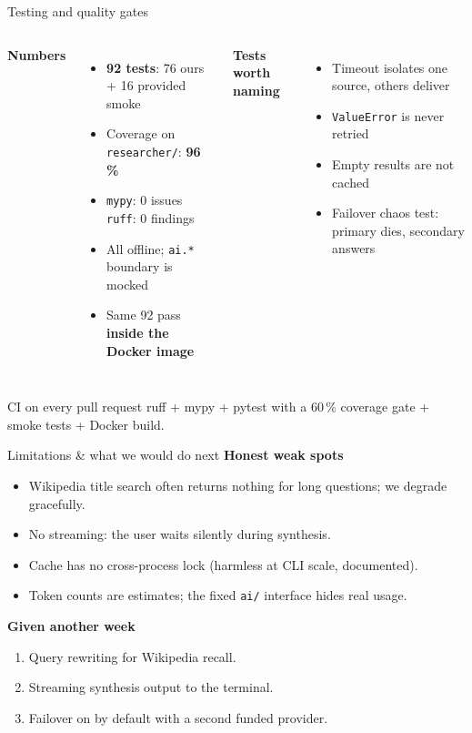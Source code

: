 \documentclass[aspectratio=169,10pt]{beamer}
\begin{document}
\begin{frame}{Testing and quality gates}
  \begin{columns}[T,onlytextwidth]
  \textbf{Numbers}
  \begin{itemize}\setlength\itemsep{0.35em}
    \item \textbf{92 tests}: 76 ours + 16 provided smoke
    \item Coverage on \texttt{researcher/}: \textbf{96\,\%}
    \item \texttt{mypy}: 0 issues \quad \texttt{ruff}: 0 findings
    \item All offline; \texttt{ai.*} boundary is mocked
    \item Same 92 pass \textbf{inside the Docker image}
  \end{itemize}

  \textbf{Tests worth naming}
  \begin{itemize}\setlength\itemsep{0.35em}
    \item Timeout isolates one source, others deliver
    \item \texttt{ValueError} is never retried
    \item Empty results are not cached
    \item Failover chaos test: primary dies, secondary answers
  \end{itemize}
  \end{columns}

  \vspace{0.8em}
  \begin{block}{CI on every pull request}
    ruff + mypy + pytest with a 60\,\% coverage gate + smoke tests + Docker build.
  \end{block}
\end{frame}

\begin{frame}{Limitations \& what we would do next}
  \textbf{Honest weak spots}
  \begin{itemize}\setlength\itemsep{0.35em}
    \item Wikipedia title search often returns nothing for long questions; we degrade gracefully.
    \item No streaming: the user waits silently during synthesis.
    \item Cache has no cross-process lock (harmless at CLI scale, documented).
    \item Token counts are estimates; the fixed \texttt{ai/} interface hides real usage.
  \end{itemize}

  \vspace{0.7em}
  \textbf{Given another week}
  \begin{enumerate}\setlength\itemsep{0.35em}
    \item Query rewriting for Wikipedia recall.
    \item Streaming synthesis output to the terminal.
    \item Failover on by default with a second funded provider.
  \end{enumerate}
\end{frame}
\end{document}
